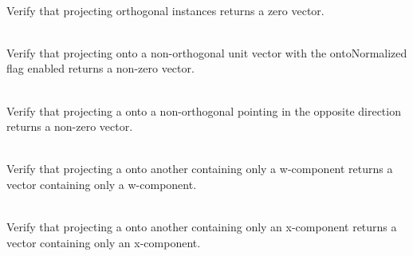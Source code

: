 \begin{DoxyRefList}
\item[{\parbox[t]{\linewidth}{Member \doxylink{_projection_tests_8cpp_a2d36e548a5fa68485f9df5e99b976054}{Vector4\+DProjection\+\_\+\+Orthogonal\+Vectors\+Returns\+Zero\+Vector} ()}}]\hfill \\
\label{test__test000125}%
%
Verify that projecting orthogonal  instances returns a zero vector.  
\item[{\parbox[t]{\linewidth}{Member \doxylink{_projection_tests_8cpp_a5c98e5dfa6f33cf5ef4bb5899521b7ba}{Vector4\+DProjection\+\_\+\+Projection\+Onto\+Normalized\+Vector\+Returns\+Non\+Zero\+Vector} ()}}]\hfill \\
\label{test__test000132}%
%
Verify that projecting onto a non-\/orthogonal unit vector with the {\ttfamily onto\+Normalized} flag enabled returns a non-\/zero vector.  
\item[{\parbox[t]{\linewidth}{Member \doxylink{_projection_tests_8cpp_ad198f693248bbefe2a057a692382b4c5}{Vector4\+DProjection\+\_\+\+Projection\+Onto\+Vector\+In\+Opposite\+Direction\+Returns\+Non\+Zero\+Vector\+In\+Same\+Direction} ()}}]\hfill \\
\label{test__test000133}%
%
Verify that projecting a  onto a non-\/orthogonal  pointing in the opposite direction returns a non-\/zero vector.  
\item[{\parbox[t]{\linewidth}{Member \doxylink{_projection_tests_8cpp_a8f8dc73c13c6ce9bb70a24dfb5cbe8fa}{Vector4\+DProjection\+\_\+\+Projection\+Onto\+WAxis\+Returns\+Vector\+With\+Only\+WComponent} ()}}]\hfill \\
\label{test__test000129}%
%
Verify that projecting a  onto another  containing only a w-\/component returns a vector containing only a w-\/component.  
\item[{\parbox[t]{\linewidth}{Member \doxylink{_projection_tests_8cpp_a35d5fbb770050eee83448ee9775f324b}{Vector4\+DProjection\+\_\+\+Projection\+Onto\+XAxis\+Returns\+Vector\+With\+Only\+XComponent} ()}}]\hfill \\
\label{test__test000126}%
%
Verify that projecting a  onto another  containing only an x-\/component returns a vector containing only an x-\/component.  

\end{DoxyRefList}
